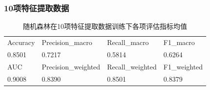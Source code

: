 \documentclass[10pt]{article}
\begin{document}
\subsubsection*{10项特征提取数据}
\begin{table}[H]
  \centering
  \caption{随机森林在10项特征提取数据训练下各项评估指标均值}
  \begin{tabular}{llll}
  \toprule
  Accuracy & Precision\_macro & Recall\_macro & F1\_macro \\
  0.8501 & 0.7217 & 0.5814 & 0.6264 \\
  \midrule
  AUC & Precision\_weighted & Recall\_weighted & F1\_weighted \\
  0.9008 & 0.8390 & 0.8501 & 0.8379 \\
  \bottomrule
  \end{tabular}
\end{table}
\end{document}
